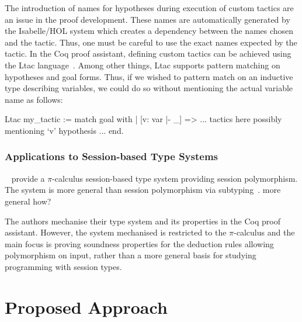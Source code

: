 \documentclass{mprop}
\newcommand{\1}{\textbf{1}\xspace}
\begin{document}
The introduction of names for hypotheses during execution of custom tactics are an issue in the proof development. These names are automatically generated by the Isabelle/HOL system which creates a dependency between the names chosen and the tactic. Thus, one must be careful to use the exact names expected by the tactic. In the Coq proof assistant, defining custom tactics can be achieved using the Ltac language~\cite{Delahaye:2000:TLS}. Among other things, Ltac supports pattern matching on hypotheses and goal forms. Thus, if we wished to pattern match on an inductive type describing variables, we could do so without mentioning the actual variable name as follows:

\begin{coq}
Ltac my_tactic :=
  match goal with
  | [v: var |- _] => ... tactics here possibly mentioning `v' hypothesis ...
  end.
\end{coq}

\subsubsection{Applications to Session-based Type Systems}\label{sec:asts}

\citeauthor{Goto:2014}~\cite{Goto:2014} provide a $\pi$-calculus session-based type system providing session polymorphism. The system is more general than session polymorphism via subtyping~\cite{Gay:2005:SST}. more general how?


 The authors mechanise their type system and its properties in the Coq proof assistant. However, the system mechanised is restricted to the $\pi$-calculus and the main focus is proving soundness properties for the deduction rules allowing polymorphism on input, rather than a more general basis for studying programming with session types.

\section{Proposed Approach}\label{sec:approach}

\end{document}
